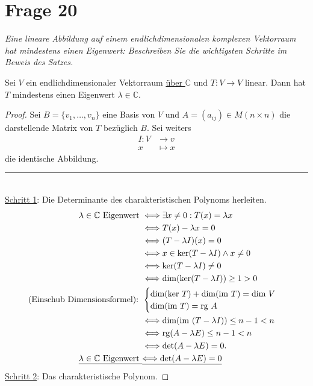 \section{Frage 20}
\textit{Eine lineare Abbildung auf einem endlichdimensionalen komplexen Vektorraum hat mindestens einen Eigenwert:
Beschreiben Sie die wichtigsten Schritte im Beweis des Satzes.}
\begin{theorem}
    Sei $V$ ein endlichdimensionaler Vektorraum \underline{über $\mathbb{C}$} und $T:V\to V$ linear. Dann hat
    $T$ mindestens einen Eigenwert $\lambda\in\mathbb{C}$.
\end{theorem}
\begin{proof}
    Sei $B=\{v_1,\dots,v_n\}$ eine Basis von $V$ und $A=(a_{ij})\in M(n\times n)$ die darstellende Matrix
    von $T$ bezüglich $B$. Sei weiters 
    \begin{align*}
        I : V&\to v\\
        x &\mapsto x
    \end{align*}
    die identische Abbildung.\\
    \rule{\textwidth}{0.2px}\\
    \underline{Schritt 1}: Die Determinante des charakteristischen Polynoms herleiten.
    \begin{align*}
        \lambda\in \mathbb{C} \text{ Eigenwert } &\Longleftrightarrow \exists x\neq 0 : T(x)=\lambda x\\
        &\Longleftrightarrow T(x) - \lambda x = 0\\
        &\Longleftrightarrow (T-\lambda I) (x) = 0\\
        &\Longleftrightarrow x\in \mathrm{ker}(T-\lambda I) \land x\neq 0\\
        &\Longleftrightarrow\mathrm{ker}(T-\lambda I)\neq 0\\
        &\Longleftrightarrow\mathrm{dim}(\mathrm{ker}(T-\lambda I)) \geq 1 > 0\\
        \text{(Einschub Dimensionsformel): } &\begin{cases}
            \mathrm{dim}(\mathrm{ker}\ T) + \mathrm{dim}(\mathrm{im}\ T) = \mathrm{dim}\ V\\
            \mathrm{dim}(\mathrm{im}\ T)=\mathrm{rg}\ A
        \end{cases}\\
        &\Longleftrightarrow\mathrm{dim}(\mathrm{im}\ (T-\lambda I)) \leq n-1 < n\\
        &\Longleftrightarrow\mathrm{rg}(A-\lambda E) \leq n-1 < n\\
        &\Longleftrightarrow\det (A- \lambda E) = 0.\\
        \underline{\lambda\in \mathbb{C} \text{ Eigenwert } }&\underline{\Longleftrightarrow \det (A- \lambda E) = 0}
    \end{align*}
    \underline{Schritt 2}: Das charakteristische Polynom.
    

\end{proof}
